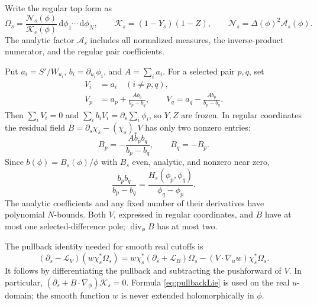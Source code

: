 \documentclass[11pt]{article}
\numberwithin{equation}{section}
\theoremstyle{definition}
\newcommand{\dd}{\,\mathrm d}
\newcommand{\Li}{\mathcal L}
\begin{document}
Write the regular top form as
\[
 \Omega_s=
  \frac{\mathscr N_s(\phi)}{\mathcal K_s(\phi)}
       \dd\phi_1\cdots\dd\phi_N,\qquad
 \mathcal K_s=(1-Y_s)(1-Z),\qquad
 \mathscr N_s=\Delta(\phi)^2\mathscr A_s(\phi).
\]
The analytic factor \(\mathscr A_s\) includes all normalized measures,
the inverse-product numerator, and the regular pair coefficients.

Put \(a_i=S'/W_{u_i}\), \(b_i=\partial_{u_i}\phi_i\), and
\(A=\sum_i a_i\). For a selected pair \(p,q\), set
\begin{equation}
 \begin{split}
 V_i&=a_i\quad(i\ne p,q),\\
 V_p&=a_p+\frac{Ab_q}{b_p-b_q},\qquad
 V_q=a_q-\frac{Ab_p}{b_p-b_q}.
 \end{split}\label{eq:twofield}
\end{equation}
Then \(\sum_iV_i=0\) and
\(\sum_i b_iV_i=\partial_s\sum_i\phi_i\), so \(Y,Z\) are frozen.
In regular coordinates the residual field
\(B=\partial_s\chi_s-(\chi_s)_*V\) has only two nonzero entries:
\[
 B_p=-\frac{Ab_pb_q}{b_p-b_q},\qquad B_q=-B_p.
\]
Since \(b(\phi)=B_s(\phi)/\phi\) with \(B_s\) even, analytic, and
nonzero near zero,
\[
 \frac{b_pb_q}{b_p-b_q}
     =\frac{H_s(\phi_p,\phi_q)}{\phi_q-\phi_p}.
\]
The analytic coefficients and any fixed number of their derivatives
have polynomial \(N\)-bounds. Both \(V\), expressed in regular
coordinates, and \(B\) have at most one selected-difference pole;
\(\operatorname{div}_\phi B\) has at most two.

The pullback identity needed for smooth real cutoffs is
\begin{equation}
 (\partial_s-\Li_V)(w\chi_s^*\Omega_s)
  =w\chi_s^*(\partial_s+\Li_B)\Omega_s
       -(V\cdot\nabla_u w)\chi_s^*\Omega_s.
 \label{eq:pullbackLie}
\end{equation}
It follows by differentiating the pullback and subtracting the
pushforward of \(V\). In particular,
\((\partial_s+B\cdot\nabla_\phi)\mathcal K_s=0\).
Formula \eqref{eq:pullbackLie} is used on the real \(u\)-domain;
the smooth function \(w\) is never extended holomorphically in \(\phi\).
\end{document}
